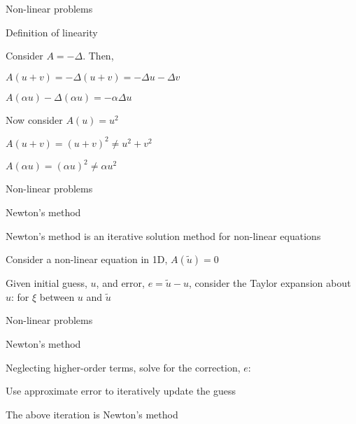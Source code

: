 \documentclass[18pt,xcolor=table]{beamer}
\begin{document}
\begin{frame}{Non-linear problems}
\begin{block}{Definition of linearity}
\bit
\item Consider $A = -\Delta$. Then,
\bit
\item $A(u + v) = -\Delta(u + v) = -\Delta u - \Delta v$
\item $A(\alpha u) -\Delta (\alpha u) = -\alpha \Delta u$
\eit
\item Now consider $A(u) = u^2$
\bit
\item $A(u + v) = (u + v)^2 \neq u^2 + v^2$
\item $A(\alpha u) = (\alpha u)^2 \neq \alpha u^2$
\eit
\eit
\end{block}
\end{frame}

\begin{frame}{Non-linear problems}
\begin{block}{Newton's method}
\bit
\item Newton's method is an iterative solution method for non-linear equations
\item Consider a non-linear equation in 1D, $A(\tilde{u}) = 0$
\item Given initial guess, $u$, and error, $e = \tilde{u} - u$, consider the Taylor expansion about $u$:
for $\xi$ between $u$ and $\tilde{u}$
\eit
\end{block}
\end{frame}

\begin{frame}{Non-linear problems}
\begin{block}{Newton's method}
\bit
\item Neglecting higher-order terms, solve for the correction, $e$:
\item Use approximate error to iteratively update the guess
\item The above iteration is Newton's method
\eit
\end{block}
\end{frame}
\end{document}
